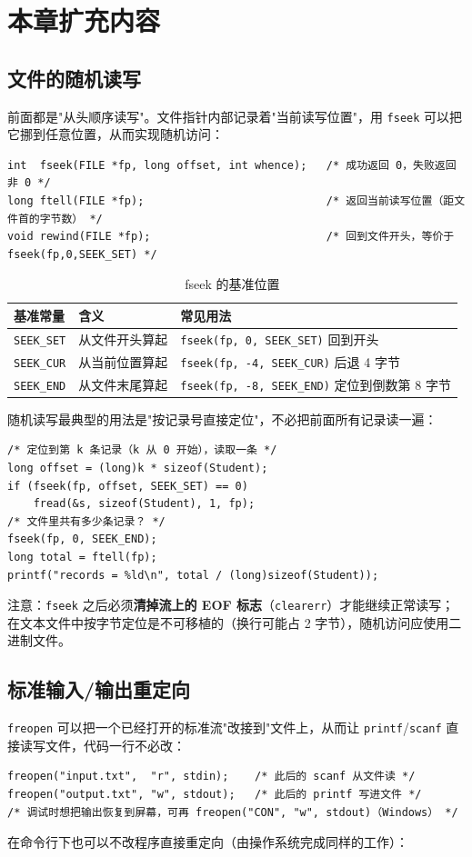 \section{本章扩充内容}
\subsection{文件的随机读写}
前面都是"从头顺序读写"。文件指针内部记录着"当前读写位置"，用 \texttt{fseek} 可以把它挪到任意位置，从而实现随机访问：
\begin{lstlisting}
int  fseek(FILE *fp, long offset, int whence);   /* 成功返回 0，失败返回非 0 */
long ftell(FILE *fp);                            /* 返回当前读写位置（距文件首的字节数） */
void rewind(FILE *fp);                           /* 回到文件开头，等价于 fseek(fp,0,SEEK_SET) */
\end{lstlisting}

\begin{table}[htbp]
\centering
\caption{fseek 的基准位置}
\footnotesize
\begin{tabular}{@{}lll@{}}
\toprule
基准常量 & 含义 & 常见用法 \\
\midrule
\texttt{SEEK\_SET} & 从文件开头算起 & \texttt{fseek(fp, 0, SEEK\_SET)} 回到开头 \\
\texttt{SEEK\_CUR} & 从当前位置算起 & \texttt{fseek(fp, -4, SEEK\_CUR)} 后退 4 字节 \\
\texttt{SEEK\_END} & 从文件末尾算起 & \texttt{fseek(fp, -8, SEEK\_END)} 定位到倒数第 8 字节 \\
\bottomrule
\end{tabular}
\end{table}

随机读写最典型的用法是"按记录号直接定位"，不必把前面所有记录读一遍：
\begin{lstlisting}
/* 定位到第 k 条记录（k 从 0 开始），读取一条 */
long offset = (long)k * sizeof(Student);
if (fseek(fp, offset, SEEK_SET) == 0)
    fread(&s, sizeof(Student), 1, fp);
/* 文件里共有多少条记录？ */
fseek(fp, 0, SEEK_END);
long total = ftell(fp);
printf("records = %ld\n", total / (long)sizeof(Student));
\end{lstlisting}
注意：\texttt{fseek} 之后必须\textbf{清掉流上的 EOF 标志}（\texttt{clearerr}）才能继续正常读写；在文本文件中按字节定位是不可移植的（换行可能占 2 字节），随机访问应使用二进制文件。

\subsection{标准输入/输出重定向}
\texttt{freopen} 可以把一个已经打开的标准流"改接到"文件上，从而让 \texttt{printf}/\texttt{scanf} 直接读写文件，代码一行不必改：
\begin{lstlisting}
freopen("input.txt",  "r", stdin);    /* 此后的 scanf 从文件读 */
freopen("output.txt", "w", stdout);   /* 此后的 printf 写进文件 */
/* 调试时想把输出恢复到屏幕，可再 freopen("CON", "w", stdout)（Windows） */
\end{lstlisting}
在命令行下也可以不改程序直接重定向（由操作系统完成同样的工作）：

